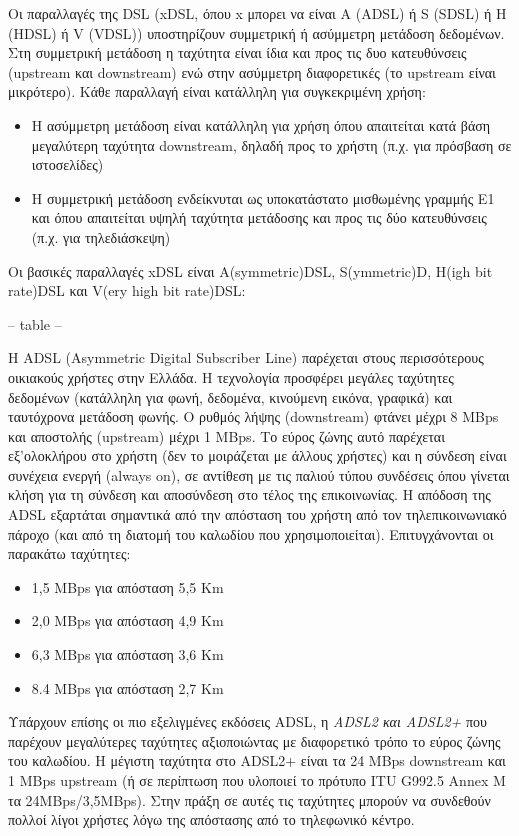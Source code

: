 Οι παραλλαγές της DSL (xDSL, όπου x μπορει να είναι Α (ADSL) ή S (SDSL) ή H (HDSL) ή V (VDSL)) υποστηρίζουν συμμετρική ή ασύμμετρη μετάδοση δεδομένων. Στη συμμετρική μετάδοση η ταχύτητα είναι ίδια και προς τις δυο κατευθύνσεις (upstream και downstream) ενώ στην ασύμμετρη διαφορετικές (το upstream είναι μικρότερο).  Κάθε παραλλαγή είναι κατάλληλη για συγκεκριμένη χρήση:


\begin{itemize}
\item Η ασύμμετρη μετάδοση είναι κατάλληλη για χρήση όπου απαιτείται κατά βάση μεγαλύτερη ταχύτητα downstream, δηλαδή προς το χρήστη (π.χ. για πρόσβαση σε ιστοσελίδες)
\item Η συμμετρική μετάδοση ενδείκνυται ως υποκατάστατο μισθωμένης γραμμής Ε1 και όπου απαιτείται υψηλή ταχύτητα μετάδοσης και προς τις δύο κατευθύνσεις (π.χ. για τηλεδιάσκεψη)
\end{itemize}
 
 Οι βασικές παραλλαγές xDSL είναι Α(symmetric)DSL, S(ymmetric)D, H(igh bit rate)DSL και V(ery high bit rate)DSL:
 
 -- table --
 
 H ADSL (Asymmetric Digital Subscriber Line) παρέχεται στους περισσότερους οικιακούς χρήστες στην Ελλάδα. Η τεχνολογία προσφέρει μεγάλες ταχύτητες δεδομένων (κατάλληλη για φωνή, δεδομένα, κινούμενη εικόνα, γραφικά) και ταυτόχρονα μετάδοση φωνής. Ο ρυθμός λήψης (downstream) φτάνει μέχρι 8 MBps και αποστολής (upstream) μέχρι 1 MBps. Το εύρος ζώνης αυτό παρέχεται εξ'ολοκλήρου στο χρήστη (δεν το μοιράζεται με άλλους χρήστες) και η σύνδεση είναι συνέχεια ενεργή (always on), σε αντίθεση με τις παλιού τύπου συνδέσεις όπου γίνεται κλήση για τη σύνδεση και αποσύνδεση στο τέλος της επικοινωνίας. Η απόδοση της ADSL εξαρτάται σημαντικά από την απόσταση του χρήστη από τον τηλεπικοινωνιακό πάροχο (και από τη διατομή του καλωδίου που χρησιμοποιείται). Επιτυγχάνονται οι παρακάτω ταχύτητες:
 
 \begin{itemize}
 \item 1,5 ΜBps για απόσταση 5,5 Km
 \item 2,0 MBps για απόσταση 4,9 Km
 \item 6,3 MBps για απόσταση 3,6 Km
 \item 8.4 MBps για απόσταση 2,7 Km
 \end{itemize}
 
Υπάρχουν επίσης οι πιο εξελιγμένες εκδόσεις ADSL, η \emph{ADSL2 και ADSL2+} που παρέχουν μεγαλύτερες ταχύτητες αξιοποιώντας με διαφορετικό τρόπο το εύρος ζώνης του καλωδίου. Η μέγιστη ταχύτητα στο ADSL2+ είναι τα 24 MBps downstream και 1 MBps upstream (ή σε περίπτωση που υλοποιεί το πρότυπο ITU G992.5 Annex M τα 24ΜBps/3,5MBps). Στην πράξη σε αυτές τις ταχύτητες μπορούν να συνδεθούν πολλοί λίγοι χρήστες λόγω της απόστασης από το τηλεφωνικό κέντρο.
 
